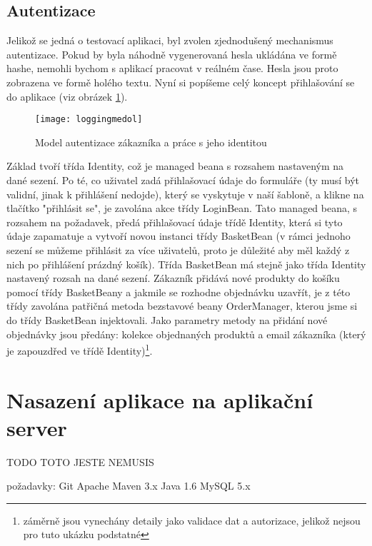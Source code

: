 \documentclass[122pt,oneside]{fithesis}
\begin{document}
\section{Autentizace}
Jelikož se jedná o testovací aplikaci, byl zvolen zjednodušený mechanismus autentizace. Pokud by byla náhodně vygenerovaná hesla ukládána ve formě hashe, nemohli bychom s aplikací pracovat v reálném čase. Hesla jsou proto zobrazena ve formě holého textu. Nyní si popíšeme celý koncept přihlašování se do aplikace (viz obrázek \ref{fig:identity}).

\begin{figure}[!ht]
\centering
\texttt{[image: loggingmedol]}
\caption{Model autentizace zákazníka a práce s jeho identitou}
\label{fig:identity}
\end{figure}

Základ tvoří třída Identity, což je managed beana s rozsahem nastaveným na dané sezení. Po té, co uživatel zadá přihlašovací údaje do formuláře (ty musí být validní, jinak k přihlášení nedojde), který se vyskytuje v naší šabloně, a klikne na tlačítko "přihlásit se", je zavolána akce třídy LoginBean. Tato managed beana, s rozsahem na požadavek, předá přihlašovací údaje třídě Identity, která si tyto údaje zapamatuje a vytvoří novou instanci třídy BasketBean (v rámci jednoho sezení se můžeme přihlásit za více uživatelů, proto je důležité aby měl každý z nich po přihlášení prázdný košík). Třída BasketBean má stejně jako třída Identity nastavený rozsah na dané sezení. Zákazník přidává nové produkty do košíku pomocí třídy BasketBeany a jakmile se rozhodne objednávku uzavřít, je z této třídy zavolána patřičná metoda bezstavové beany OrderManager, kterou jsme si do třídy BasketBean injektovali. Jako parametry metody na přidání nové objednávky jsou předány: kolekce objednaných produktů a email zákazníka (který je zapouzdřed ve třídě Identity)\footnote[1]{záměrně jsou vynechány detaily jako validace dat a autorizace, jelikož nejsou pro tuto ukázku podstatné}.



\chapter{Nasazení aplikace na aplikační server}

TODO TOTO JESTE NEMUSIS

požadavky:
Git
Apache Maven 3.x
Java 1.6
MySQL 5.x
\end{document}
